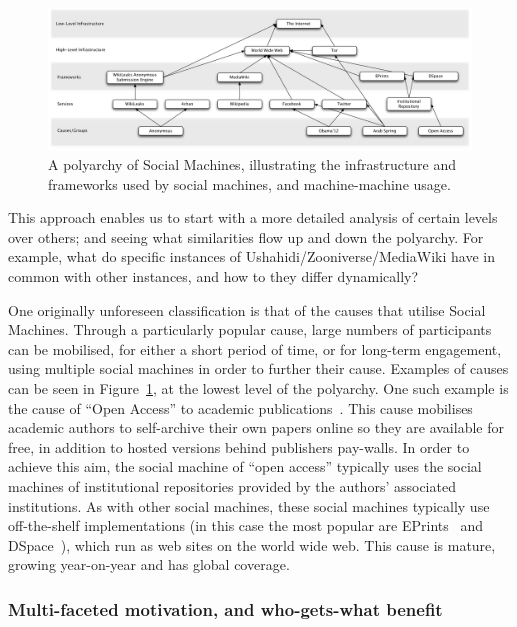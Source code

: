 \documentclass{sig-alternate}
\begin{document}
\begin{figure}[htb]
\begin{center}
\includegraphics[width=18cm]{img/polyarchy.pdf}
\caption{A polyarchy of Social Machines, illustrating the infrastructure and frameworks used by social machines, and machine-machine usage.} \label{polyarchy}
\end{center}
\end{figure}

This approach enables us to start with a more detailed analysis of certain levels over others;
and seeing what similarities flow up and down the polyarchy. For example, what do
specific instances of Ushahidi/Zooniverse/MediaWiki have in common with other instances, and
how to they differ dynamically?

One originally unforeseen classification is that of the causes that utilise Social Machines.
Through a particularly popular cause, large numbers of participants can be mobilised, for
either a short period of time, or for long-term engagement, using multiple social machines
in order to further their cause. Examples of causes can be seen in Figure~\ref{polyarchy},
at the lowest level of the polyarchy. One such example is the cause of ``Open Access'' to
academic publications~\cite{harnad2001self}. This cause mobilises academic authors to
self-archive their own papers online so they are available for free, in addition to hosted
versions behind publishers pay-walls. In order to achieve this aim, the social machine of
``open access'' typically uses the social machines of institutional repositories provided
by the authors' associated institutions. As with other social machines, these social
machines typically use off-the-shelf implementations (in this case the most popular are
EPrints~\cite{eprints} and DSpace~\cite{dspace}), which run as web sites on the world wide
web. This cause is mature, growing year-on-year and has global coverage.

\subsubsection{Multi-faceted motivation, and who-gets-what benefit}
\end{document}
